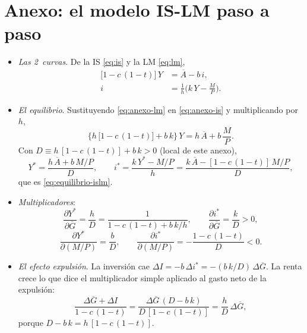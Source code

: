 \documentclass[11pt]{article}
\begin{document}
\clearpage
\appendix

\section{Anexo: el modelo IS-LM paso a paso}\label{anexo:islm}

\begin{itemize}
\item \emph{Las 2~curvas}. De la IS \eqref{eq:is} y la LM \eqref{eq:lm},
  \begin{align}
  \big[1-c\,(1-t)\big]\,Y&=\overline{A}-b\,i, \label{eq:anexo-is}\\
  i&=\frac{1}{h}\Big(k\,Y-\frac{M}{P}\Big). \label{eq:anexo-lm}
  \end{align}
\item \emph{El equilibrio}. Sustituyendo \eqref{eq:anexo-lm} en \eqref{eq:anexo-is} y multiplicando por $h$,
  \begin{equation*}
  \big\{h\,\big[1-c\,(1-t)\big]+b\,k\big\}\,Y=h\,\overline{A}+b\,\frac{M}{P}.
  \end{equation*}
  Con $D\equiv h\,[1-c\,(1-t)]+b\,k>0$ (local de este anexo),
  \begin{equation*}
  Y^*=\frac{h\,\overline{A}+b\,M/P}{D},\qquad i^*=\frac{k\,Y^*-M/P}{h}=\frac{k\,\overline{A}-[1-c\,(1-t)]\,M/P}{D},
  \end{equation*}
  que es \eqref{eq:equilibrio-islm}.
\item \emph{Multiplicadores}:
  \begin{equation*}
  \frac{\partial Y^*}{\partial\overline{G}}=\frac{h}{D}=\frac{1}{1-c\,(1-t)+b\,k/h},\qquad \frac{\partial i^*}{\partial\overline{G}}=\frac{k}{D}>0,
  \end{equation*}
  \begin{equation*}
  \frac{\partial Y^*}{\partial(M/P)}=\frac{b}{D},\qquad \frac{\partial i^*}{\partial(M/P)}=-\frac{1-c\,(1-t)}{D}<0.
  \end{equation*}
\item \emph{El efecto expulsión}. La inversión cae $\Delta I=-b\,\Delta i^*=-(b\,k/D)\,\Delta\overline{G}$. La renta crece lo que dice el multiplicador simple aplicado al gasto neto de la expulsión:
  \begin{equation*}
  \frac{\Delta\overline{G}+\Delta I}{1-c\,(1-t)}=\frac{\Delta\overline{G}\,(D-b\,k)}{D\,[1-c\,(1-t)]}=\frac{h}{D}\,\Delta\overline{G},
  \end{equation*}
  porque $D-b\,k=h\,[1-c\,(1-t)]$.

\end{itemize}
\end{document}
